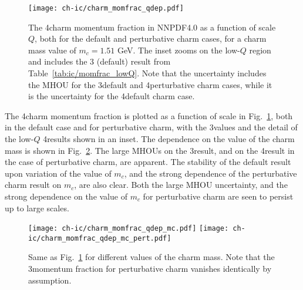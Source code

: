 \begin{figure}[h]
  \begin{center}
     \texttt{[image: ch-ic/charm\_momfrac\_qdep.pdf]}
    \caption{\small 
      The 4\fns charm momentum fraction in NNPDF4.0 as a function of scale $Q$,
      both for the default and perturbative charm cases,
      for a charm mass value of $m_c=1.51$ GeV.
     The inset zooms on the low-$Q$ region and includes the 3\fns
     (default) result
     from Table~\ref{tab:ic/momfrac_lowQ}. 
     Note that the uncertainty includes the MHOU for the 3\fns default
     and 4\fns perturbative charm cases, while it is the \pdf
     uncertainty for the 4\fns default charm case.
  \label{fig:ic/comparison_IC_models} }
\end{center}
\end{figure}

The 4\fns charm momentum fraction is plotted as a function of scale
in Fig.~\ref{fig:ic/comparison_IC_models}, both in the default case and
for perturbative charm, with the 3\fns values and the detail of the low-$Q$ 
4\fns results shown in an inset.
%
The dependence on the value of the charm mass
is shown in Fig.~\ref{fig:ic/charm_momfrac_qdep_mc}.
The large MHOUs on the 3\fns result, and on the 
4\fns result in the case of perturbative charm, are apparent.
The stability of the default result upon variation of  the value of
$m_c$, and the strong dependence of the perturbative charm result on
$m_c$, are  also clear.
Both the large MHOU uncertainty, and the strong dependence on
the value of $m_c$
for perturbative charm are seen to persist up to large scales.


\begin{figure}[t]
  \begin{center}
    \texttt{[image: ch-ic/charm\_momfrac\_qdep\_mc.pdf]}
    \texttt{[image: ch-ic/charm\_momfrac\_qdep\_mc\_pert.pdf]}
    \caption{\small
    Same as Fig.~\ref{fig:ic/comparison_IC_models} for different values
    of the charm mass. Note that the 3\fns momentum fraction for
     perturbative charm vanishes identically by assumption.
   \label{fig:ic/charm_momfrac_qdep_mc} }
\end{center}
\end{figure}

